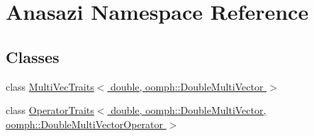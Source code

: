 \hypertarget{namespaceAnasazi}{}\section{Anasazi Namespace Reference}
\label{namespaceAnasazi}
\subsection*{Classes}
\begin{DoxyCompactItemize}
\item 
class \hyperlink{classAnasazi_1_1MultiVecTraits_3_01double_00_01oomph_1_1DoubleMultiVector_01_4}{Multi\+Vec\+Traits$<$ double, oomph\+::\+Double\+Multi\+Vector $>$}
\item 
class \hyperlink{classAnasazi_1_1OperatorTraits_3_01double_00_01oomph_1_1DoubleMultiVector_00_01oomph_1_1DoubleMultiVectorOperator_01_4}{Operator\+Traits$<$ double, oomph\+::\+Double\+Multi\+Vector, oomph\+::\+Double\+Multi\+Vector\+Operator $>$}
\end{DoxyCompactItemize}
